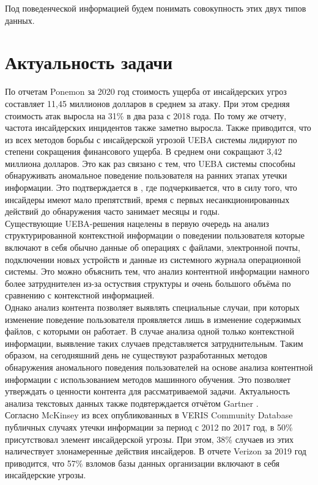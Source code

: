 Под поведенческой информацией будем понимать совокупность этих двух типов данных.

\section*{Актуальность задачи}

По отчетам Ponemon за 2020 год \cite{PonemonReport20182018} стоимость ущерба от инсайдерских угроз составляет 11,45 миллионов долларов в среднем за атаку. При этом средняя стоимость атак выросла на 31\% в два раза с 2018 года. По тому же отчету, частота инсайдерских инцидентов также заметно выросла. Также приводится, что из всех методов борьбы с инсайдерской угрозой UEBA системы лидируют по степени сокращения финансового ущерба. В среднем они сокращают 3,42 миллиона долларов. Это как раз связано с тем, что UEBA системы способны обнаруживать аномальное поведение пользователя на ранних этапах утечки информации. Это подтверждается в \cite{2019InsiderThreat}, где подчеркивается, что в силу того, что инсайдеры имеют мало препятствий, время с первых несанкционированных действий до обнаружения часто занимает месяцы и годы.\\

Существующие UEBA-решения нацелены в первую очередь на анализ структурированной контекстной информации о поведении пользователя которые включают в себя обычно данные об операциях с файлами, электронной почты, подключении новых устройств и данные из системного журнала операционной системы. Это можно объяснить тем, что анализ контентной информации намного более затруднителен из-за остуствия структуры и очень большого объёма по сравнению с контекстной информацией.\\

Однако анализ контента позволяет выявлять специальные случаи, при которых изменение поведение пользователя проявляется лишь в изменение содержимых файлов, с которыми он работает. В случае анализа одной только контекстной информации, выявление таких случаев представляется затруднительным. Таким образом, на сегодняшний день не существуют разработанных методов обнаружения аномального поведения пользователей на основе анализа контентной информации с использованием методов машинного обучения. Это позволяет утверждать о ценности контента для рассматриваемой задачи. Актуальность анализа текстовых данных также подвтерждается отчётом Gartner \cite{GartnerReportMarket2019}.\\

Согласно McKinsey \cite{InsiderThreatHuman} из всех опубликованных в VERIS Community Database публичных случаях утечки информации за период с 2012 по 2017 год, в 50\% присутствовал элемент инсайдерской угрозы. При этом, 38\% случаев из этих наличествует злонамеренные действия инсайдеров. В отчете Verizon за 2019 год \cite{2019InsiderThreat} приводится, что 57\% взломов базы данных организации включают в себя инсайдерские угрозы.\\

